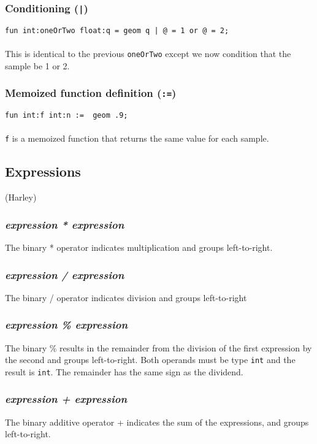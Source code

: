 \subsubsection{Conditioning (\texttt{|})}
\texttt{fun int:oneOrTwo float:q = geom q | @ = 1 or @ = 2;}\\
\\
This is identical to the previous \texttt{oneOrTwo} except we now condition that the sample be 1 or 2.

\subsubsection{Memoized function definition (\texttt{:=})}
\texttt{fun int:f int:n := ~geom .9;}\\
\\
\texttt{f} is a memoized function that returns the same value for each sample.

\subsection{Expressions}

(Harley)


\subsubsection{\textit{expression * expression}}
The binary * operator indicates multiplication and groups left-to-right.
\\
\subsubsection{\textit{expression / expression}}
The binary / operator indicates division and groups left-to-right 
\\
\subsubsection{\textit{expression \% expression}}
The binary \% results in the remainder from the division of the first expression by the second and groups left-to-right. Both operands must be type \texttt{int} and the result is \texttt{int}. The remainder has the same sign as the dividend.
\\
\subsubsection{\textit{expression + expression}}
The binary additive operator + indicates the sum of the expressions, and groups left-to-right.
\\
